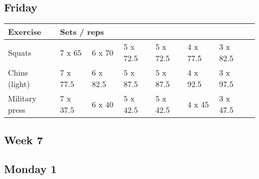 \documentclass[12pt, a4paper]{article}%
\begin{document}
  \subsection*{\hspace{0.5em} Friday }


  \begin{tabular}{l|lllllll}
  \hspace{0.75em} \textbf{Exercise} & \multicolumn{ 7 }{l}{ \textbf{Sets / reps} } \\ \hline

            \hspace{0.75em} Squats
            & 7 x 65
            & 6 x 70
            & 5 x 72.5
            & 5 x 72.5
            & 4 x 77.5
            & 3 x 82.5
            & 
            \\


            \hspace{0.75em} Chins (light)
            & 7 x 77.5
            & 6 x 82.5
            & 5 x 87.5
            & 5 x 87.5
            & 4 x 92.5
            & 3 x 97.5
            & 
            \\


            \hspace{0.75em} Military press
            & 7 x 37.5
            & 6 x 40
            & 5 x 42.5
            & 5 x 42.5
            & 4 x 45
            & 3 x 47.5
            & 
            \\


  \end{tabular}


\clearpage \subsection*{\hspace{0.25em} Week 7 }
  \subsection*{\hspace{0.5em} Monday 1 }
\end{document}
